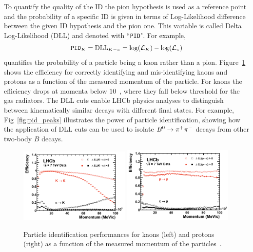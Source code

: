 To quantify the quality of the ID the pion hypothesis is used as a reference point and the probability
of a specific ID is given in terms of  Log-Likelihood difference between the given ID hypothesis and the pion one.
This variable is called Delta Log-Likelihood (DLL) and denoted with ``\verb!PID!".
For example,
\begin{equation}
\verb!PID!_K = \text{DLL}_{K-\pi} = \log(\mathcal{L}_K) - \log(\mathcal{L}_\pi)
\end{equation}
quantifies the probability of a particle being a kaon rather than a pion.
Figure~\ref{fig:pid_perf} shows the efficiency for correctly identifying and mis-identifying kaons and protons
as a function of the measured momentum of the particle. For kaons the efficiency drops at momenta below
10~\gev, where they fall below threshold for the gas radiators. 
The DLL cuts enable LHCb physics analyses to distinguish between kinematically similar decays 
with different final states. %
For example, Fig~\ref{fig:pid_peaks} illustrates the power of particle identification,  showing how the application
of DLL cuts can be used to isolate $\Bz\to \pi^+\pi^-$ decays from other two-body $B$ decays.
%
\begin{figure}[h!]
\centering
\includegraphics[width=0.49\textwidth]{Detector/figs/kaon_pid_perf.png}
\includegraphics[width=0.49\textwidth]{Detector/figs/proton_pid_perf.png}
\caption{Particle identification performances for kaons (left) and protons (right) as a function
of the measured momentum of the particles~\cite{Alves:2008zz}. }
\label{fig:pid_perf}
\end{figure}
